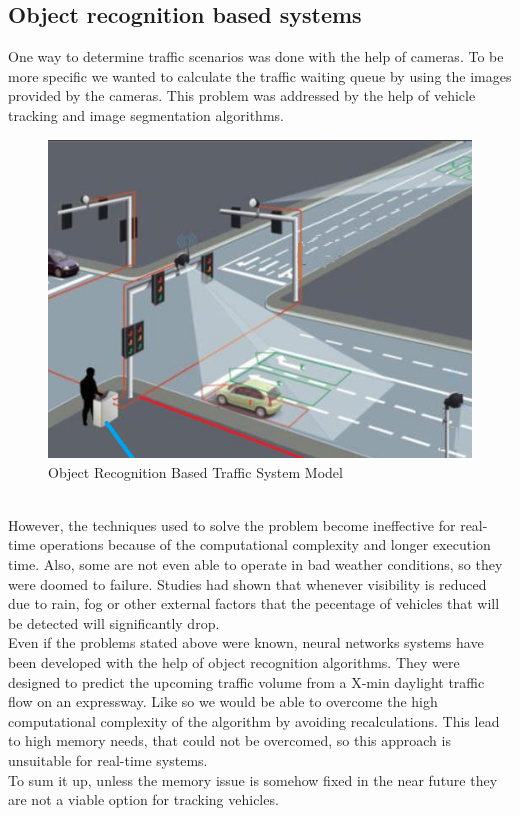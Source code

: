 \documentclass[17pt]{article}
\begin{document}
\subsection{Object recognition based systems}
\indent \indent
One way to determine traffic scenarios was done with
the help of cameras. To be more specific we wanted to 
calculate the traffic waiting queue by using the 
images provided by the cameras. This problem was addressed by the
help of vehicle tracking and image segmentation algorithms.
\begin{figure}[h!]
    \includegraphics[width=\textwidth]{ObjectRecognitionSystemRepresentation.png}
    \caption{Object Recognition Based Traffic System Model \textcopyright}
    \label{fig:ObjectRecognitionSystem}
\end{figure}
\\
\indent \indent
However, the techniques used to solve the problem
become ineffective for real-time operations because of the 
computational complexity and longer execution time. Also,
some are not even able to operate in bad weather conditions,
so they were doomed to failure. Studies had shown that whenever
visibility is reduced due to rain, fog or other external factors that
the pecentage of vehicles that will be detected will significantly drop.
\cite{Sheeny2021} \\
\indent \indent
Even if the problems stated above were known,
neural networks systems have been developed with the help of
object recognition algorithms.
They were designed to predict the upcoming traffic volume
from a X-min daylight traffic flow on an expressway. 
Like so we would be able to overcome the high computational
complexity of the algorithm by avoiding 
recalculations. This lead to high memory needs,
that could not be overcomed, so this approach is
unsuitable for real-time systems.\\
\indent \indent
To sum it up, unless the memory
issue is somehow fixed in the near future they are not a
viable option for tracking vehicles.\\
\end{document}
